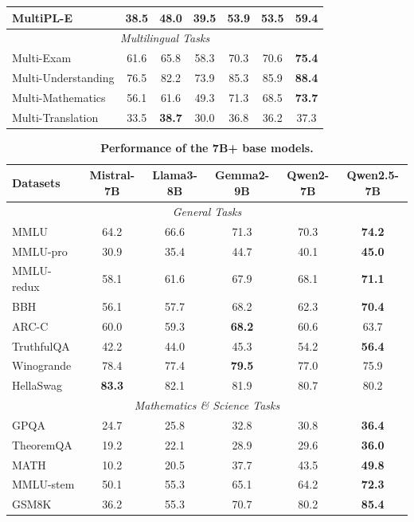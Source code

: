 \documentclass{article}
\begin{document}
\begin{table}[tbp]
\begin{tabular}{@{}lcccccc@{}}
MultiPL-E     & 38.5 & 48.0 & 39.5 & 53.9 & 53.5 & \textbf{59.4} \\
\midrule
\multicolumn{7}{c}{\textit{Multilingual Tasks}} \\
\midrule
Multi-Exam         & 61.6 & 65.8 & 58.3 & 70.3 & 70.6 & \textbf{75.4} \\
Multi-Understanding& 76.5 & 82.2 & 73.9 & 85.3 & 85.9 & \textbf{88.4} \\
Multi-Mathematics  & 56.1 & 61.6 & 49.3 & 71.3 & 68.5 & \textbf{73.7} \\
Multi-Translation  & 33.5 & \textbf{38.7} & 30.0 & 36.8 & 36.2 & 37.3 \\
\bottomrule
\end{tabular}
\end{table}

\begin{table}[tbp]
\centering
\caption{\textbf{Performance of the 7B+ base models.}}
\label{tab:base-7B}
\small
\begin{tabular}{@{}lccccc@{}}
\toprule
\textbf{Datasets} & \textbf{Mistral-7B} & \textbf{Llama3-8B} & \textbf{Gemma2-9B} & \textbf{Qwen2-7B} & \textbf{Qwen2.5-7B} \\
\midrule
\multicolumn{6}{c}{\textit{General Tasks}} \\
\midrule
MMLU & 64.2 & 66.6 & 71.3 & 70.3 & \textbf{74.2} \\
MMLU-pro & 30.9 & 35.4 & 44.7 & 40.1 & \textbf{45.0} \\
MMLU-redux & 58.1 & 61.6 & 67.9 & 68.1 & \textbf{71.1} \\
BBH & 56.1 & 57.7 & 68.2 & 62.3 & \textbf{70.4} \\
ARC-C & 60.0 & 59.3 & \textbf{68.2} & 60.6 & 63.7 \\
TruthfulQA & 42.2 & 44.0 & 45.3 & 54.2 & \textbf{56.4} \\
Winogrande & 78.4 & 77.4 & \textbf{79.5} & 77.0 & 75.9 \\
HellaSwag & \textbf{83.3} & 82.1 & 81.9 & 80.7 & 80.2 \\
\midrule
\multicolumn{6}{c}{\textit{Mathematics \& Science Tasks}} \\
\midrule
GPQA & 24.7 & 25.8 & 32.8 & 30.8 & \textbf{36.4} \\
TheoremQA & 19.2 & 22.1 & 28.9 & 29.6 & \textbf{36.0} \\
MATH & 10.2 & 20.5 & 37.7 & 43.5 & \textbf{49.8} \\
MMLU-stem & 50.1 & 55.3 & 65.1 & 64.2 & \textbf{72.3} \\
GSM8K & 36.2 & 55.3 & 70.7 & 80.2 & \textbf{85.4} \\

\end{tabular}
\end{table}
\end{document}
